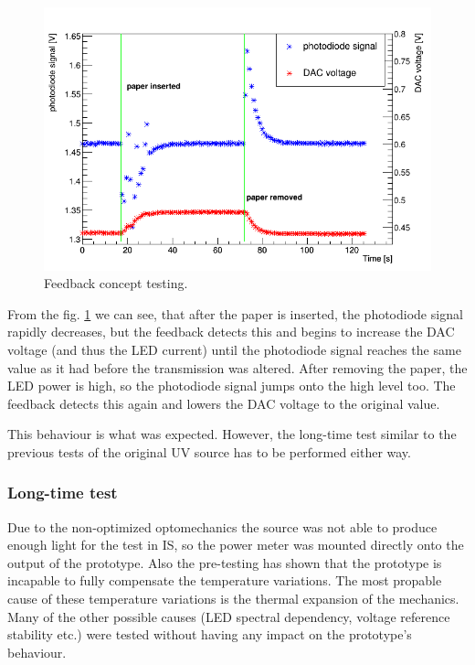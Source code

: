 \begin{figure}[H]
 \centering
 \includegraphics[scale=0.5]{./pictures/Stabilizin.png}
 \caption{Feedback concept testing.}
 \label{Feedback testing}
\end{figure}

From the fig. \ref{Feedback testing} we can see, that after the paper is inserted, the photodiode signal rapidly decreases, but the feedback detects this and begins to increase the DAC voltage (and thus the LED current) until the photodiode signal reaches the same value as it had before the transmission was altered. After removing the paper, the LED power is high, so the photodiode signal jumps onto the high level too. The feedback detects this again and lowers the DAC voltage to the original value. 
\par
This behaviour is what was expected. However, the long-time test similar to the previous tests of the original UV source has to be performed either way. 


\subsubsection{Long-time test}

Due to the non-optimized optomechanics the source was not able to produce enough light for the test in IS, so the power meter was mounted directly onto the output of the prototype. Also the pre-testing has shown that the prototype is incapable to fully compensate the temperature variations. The most propable cause of these temperature variations is the thermal expansion of the mechanics. Many of the other possible causes (LED spectral dependency, voltage reference stability etc.) were tested without having any impact on the prototype's behaviour. 


